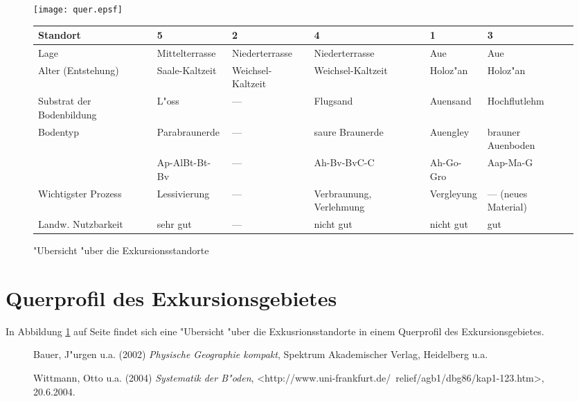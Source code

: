 \documentclass[titlepage,a4paper]{article}
\begin{document}
\begin{figure}
       
        \begin{center}
        
        \texttt{[image: quer.epsf]}
        \\[0.5cm]
        \begin{tabular}{|p{1.7cm}||p{2cm}|p{2cm}|p{1.8cm}|p{1.5cm}|p{1.5cm}|}
        \hline
        Standort & 5 & 2 & 4 & 1 & 3 \\
        \hline \hline
        Lage & Mittel\-terrasse & Nieder\-terrasse & Nieder\-terrasse & Aue & Aue\\\hline
        Alter (Entstehung) & Saale-Kaltzeit & Weichsel-Kaltzeit & Weichsel-Kaltzeit & Holoz"an & Holoz"an \\\hline
        Substrat der Bodenbildung & L"oss & --- & Flug\-sand & Auensand & Hochflut\-lehm \\\hline
        Bodentyp & Para\-braunerde & --- & saure Braunerde & Auengley &  brauner Auenboden \\
        
                & Ap-AlBt-Bt-Bv & --- & Ah-Bv-BvC-C & Ah-Go-Gro & Aap-Ma-G \\ \hline
        Wichtigster Prozess & Lessivierung & --- & Ver\-braunung, Ver\-lehmung & Ver\-gleyung & --- (neues Material) \\
                        \hline
        Landw. Nutzbarkeit & sehr gut & --- & nicht gut & nicht gut & gut \\ \hline
        \end{tabular}
        
       
        \caption{"Ubersicht "uber die Exkursionsstandorte}
        \label{quer}
         \end{center}
        \end{figure}


     
\section{Querprofil des Exkursionsgebietes}
In Abbildung \ref{quer} auf Seite \pageref{quer} findet sich eine "Ubersicht "uber die Exkusrionsstandorte in einem Querprofil des Exkursionsgebietes.

\begin{figure}
\begin{thebibliography}{9999}

Bauer, J"urgen u.a. (2002) \textit{Physische Geographie kompakt}, Spektrum Akademischer Verlag, Heidelberg u.a.

Wittmann, Otto u.a. (2004) \textit{Systematik der B"oden}, \textless http://www.uni-frankfurt.de/~relief/agb1/dbg86/kap1-123.htm\textgreater, 20.6.2004.

\end{thebibliography}
\end{figure}
\end{document}
